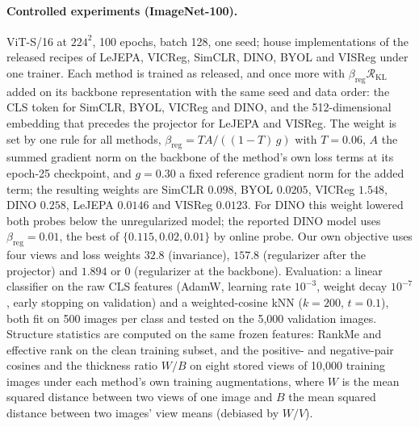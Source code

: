 \paragraph{Controlled experiments (ImageNet-100).}
ViT-S/16 at $224^2$, 100 epochs, batch 128, one seed; house implementations of the released recipes of LeJEPA, VICReg, SimCLR, DINO, BYOL and VISReg under one trainer. Each method is trained as released, and once more with $\beta_{\mathrm{reg}}\mathcal{R}_{\mathrm{KL}}$ added on its backbone representation with the same seed and data order: the CLS token for SimCLR, BYOL, VICReg and DINO, and the 512-dimensional embedding that precedes the projector for LeJEPA and VISReg. The weight is set by one rule for all methods, $\beta_{\mathrm{reg}} = T A / ((1-T)\,g)$ with $T = 0.06$, $A$ the summed gradient norm on the backbone of the method's own loss terms at its epoch-25 checkpoint, and $g = 0.30$ a fixed reference gradient norm for the added term; the resulting weights are SimCLR $0.098$, BYOL $0.0205$, VICReg $1.548$, DINO $0.258$, LeJEPA $0.0146$ and VISReg $0.0123$. For DINO this weight lowered both probes below the unregularized model; the reported DINO model uses $\beta_{\mathrm{reg}} = 0.01$, the best of $\{0.115, 0.02, 0.01\}$ by online probe. Our own objective uses four views and loss weights $32.8$ (invariance), $157.8$ (regularizer after the projector) and $1.894$ or $0$ (regularizer at the backbone). Evaluation: a linear classifier on the raw CLS features (AdamW, learning rate $10^{-3}$, weight decay $10^{-7}$, early stopping on validation) and a weighted-cosine kNN ($k{=}200$, $t{=}0.1$), both fit on 500 images per class and tested on the 5{,}000 validation images. Structure statistics are computed on the same frozen features: RankMe and effective rank on the clean training subset, and the positive- and negative-pair cosines and the thickness ratio $W/B$ on eight stored views of 10{,}000 training images under each method's own training augmentations, where $W$ is the mean squared distance between two views of one image and $B$ the mean squared distance between two images' view means (debiased by $W/V$).

